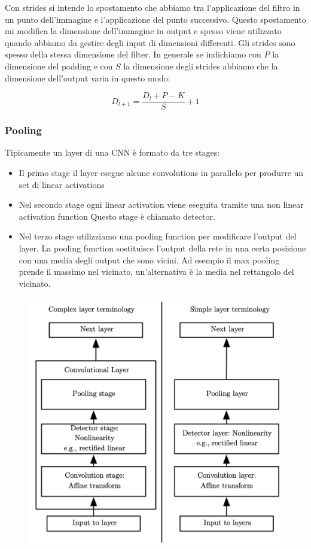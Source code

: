 \documentclass[14pt]{extreport}
\begin{document}
Con strides si intende lo spostamento che abbiamo tra l'applicazione del filtro in un punto dell'immagine e l'applicazione del punto successivo.
Questo spostamento mi modifica la dimensione dell'immagine in output e spesso viene utilizzato quando abbiamo da gestire degli input di dimensioni
differenti. Gli strides sono spesso della stessa dimensione del filter. In generale se indichiamo con $P$ la dimensione del padding e con $S$ la
dimensione degli strides abbiamo che la dimensione dell'output varia in questo modo:

$$D_{l+1} = \frac{D_l+P-K}{S} + 1$$

\subsubsection{Pooling}

Tipicamente un layer di una CNN è formato da tre stages:
\begin{itemize}
	\item Il primo stage il layer esegue alcune convolutions in parallelo per produrre un set di linear activations
	\item Nel secondo stage ogni linear activation viene eseguita tramite una non linear activation function
	Questo stage è chiamato detector.
	\item Nel terzo stage utilizziamo una pooling function per modificare l'output del layer. La pooling function sostituisce l'output della rete in una certa posizione con
	una media degli output che sono vicini. Ad esempio il max pooling prende il massimo nel vicinato, un'alternativa è la media nel rettangolo del vicinato. 
\end{itemize}

\begin{figure}[H]
	\centering
	\includegraphics[width=0.7\linewidth]{413.jpeg}
	\end{figure}
\end{document}
